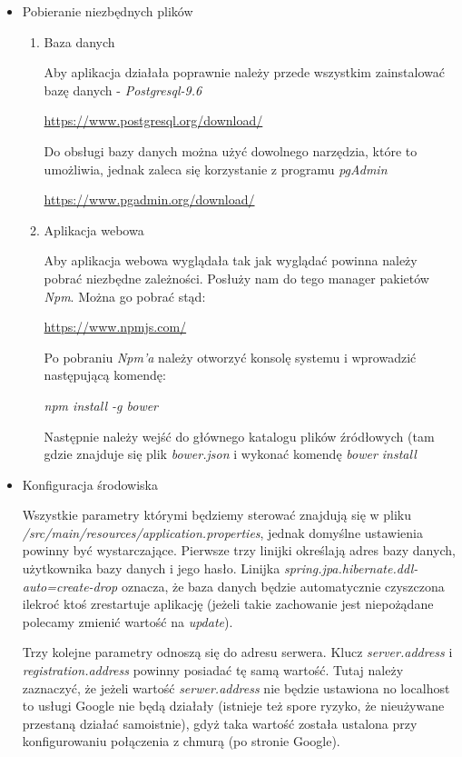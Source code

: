 \documentclass{report}
\begin{document}
\begin{itemize}
	\item Pobieranie niezbędnych plików
	
	\begin{enumerate}
		
		\item Baza danych	
		
			Aby aplikacja działała poprawnie należy przede wszystkim zainstalować bazę danych - \textit{Postgresql-9.6}
			
			\url{https://www.postgresql.org/download/}
			
			Do obsługi bazy danych można użyć dowolnego narzędzia, które to umożliwia, jednak zaleca się korzystanie z programu \textit{pgAdmin}
			
			\url{https://www.pgadmin.org/download/}
			
		\item Aplikacja webowa
		
			Aby aplikacja webowa wyglądała tak jak wyglądać powinna należy pobrać niezbędne zależności. Posłuży nam do tego manager pakietów \textit{Npm}. Można go pobrać stąd:
			
			\url{https://www.npmjs.com/}
			
			Po pobraniu \textit{Npm'a} należy otworzyć konsolę systemu i wprowadzić następującą komendę:
			
			\textit{npm install -g bower}
			
			Następnie należy wejść do głównego katalogu plików źródłowych (tam gdzie znajduje się plik \textit{bower.json} i wykonać komendę \textit{bower install}
			
	\end{enumerate}

	\item Konfiguracja środowiska
	
		Wszystkie parametry którymi będziemy sterować znajdują się w pliku \textit{/src/main/resources/application.properties}, jednak domyślne ustawienia powinny być wystarczające. Pierwsze trzy linijki określają adres bazy danych, użytkownika bazy danych i jego hasło. Linijka \textit{spring.jpa.hibernate.ddl-auto=create-drop} oznacza, że baza danych będzie automatycznie czyszczona ilekroć ktoś zrestartuje aplikację (jeżeli takie zachowanie jest niepożądane polecamy zmienić wartość na \textit{update}).
		
		Trzy kolejne parametry odnoszą się do adresu serwera. Klucz \textit{server.address} i \textit{registration.address} powinny posiadać tę samą wartość. Tutaj należy zaznaczyć, że jeżeli wartość \textit{serwer.address} nie będzie ustawiona no localhost to usługi Google nie będą działały (istnieje też spore ryzyko, że nieużywane przestaną działać samoistnie), gdyż taka wartość została ustalona przy konfigurowaniu połączenia z chmurą (po stronie Google).
		

\end{itemize}
\end{document}
